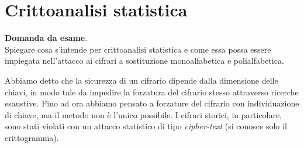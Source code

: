 \section{Crittoanalisi statistica}
\begin{framed}
	\noindent \textbf{Domanda da esame}.\\Spiegare cosa s’intende per crittoanalisi statistica e come essa possa essere impiegata nell’attacco ai
	cifrari a sostituzione monoalfabetica e polialfabetica.
\end{framed} 
Abbiamo detto che la sicurezza di un cifrario dipende dalla dimensione delle chiavi, in modo tale da impedire la forzatura del cifrario stesso attraverso ricerche esaustive. Fino ad ora abbiamo pensato a forzature del cifrario con individuazione di chiave, ma il metodo non è l'unico possibile.  I cifrari storici, in particolare, sono stati violati con un attacco statistico di tipo \emph{cipher-text} (si conosce solo il crittogramma). 

